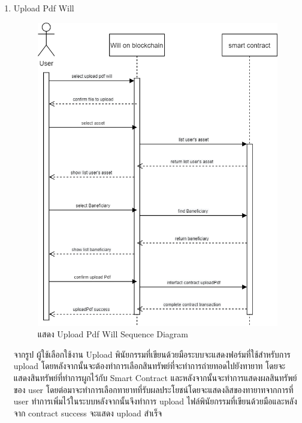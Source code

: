 \documentclass[12pt,oneside,openright,a4paper]{cpe-thai-project}
\begin{document}
\begin{enumerate}[label=\thesubsection.\arabic*,leftmargin=0pt,itemindent=2.5cm]
	\item Upload Pdf Will
		\begin{table}
		\centering
		\caption{ตารางแสดงรายละเอียดของ Use Case Connect meta mask Wallet}
		\end{table}
		\begin{figure}[!thb]
			\centering
			\includegraphics[scale=0.2]{uploadPdfWillseq}
			\caption{แสดง Upload Pdf Will Sequence Diagram}
		\end{figure}
		\FloatBarrier
	\tab จากรูป ผู้ใช้เลือกใช้งาน Upload พินัยกรรมที่เขียนด้วยมือระบบจะแสดงฟอร์มที่ใช้สำหรับการ upload โดยหลังจากนั้นจะต้องทำการเลือกสินทรัพย์ที่จะทำการถ่ายทอดไปยังทายาท โดยจะแสดงสินทรัพย์ที่ทำการผูกไว้กับ Smart Contract และหลังจากนั้นจะทำการแสดงผลสินทรัพย์ของ user โดยต่อมาจะทำการเลือกทายาทที่รับผลประโยชน์โดยจะแสดงลิสของทายาทจากการที่ user ทำการเพิ่มไว้ในระบบหลังจากนั้นจึงทำการ upload ไฟล์พินัยกรรมที่เขียนด้วยมือและหลังจาก contract success จะแสดง upload สำเร็จ

\end{enumerate}
\end{document}
